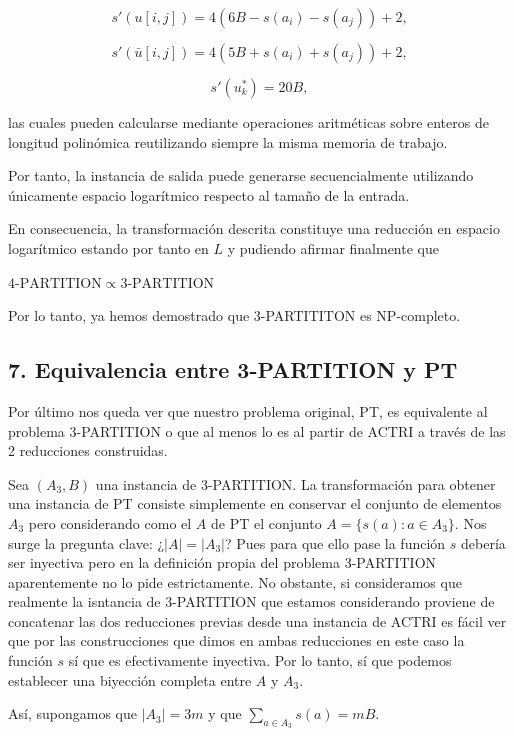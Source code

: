 \documentclass{article}
\begin{document}
\[
s'(u[i,j])=4(6B-s(a_i)-s(a_j))+2,
\]

\[
s'(\bar{u}[i,j])=4(5B+s(a_i)+s(a_j))+2,
\]

\[
s'(u_k^*)=20B,
\]

las cuales pueden calcularse mediante operaciones aritméticas sobre enteros de longitud polinómica reutilizando siempre la misma memoria de trabajo.

Por tanto, la instancia de salida puede generarse secuencialmente utilizando únicamente espacio logarítmico respecto al tamaño de la entrada.

\vspace{1\baselineskip}
En consecuencia, la transformación descrita constituye una reducción en espacio logarítmico estando por tanto en $L$ y pudiendo afirmar finalmente que 

\vspace{1\baselineskip}
$4\text{-PARTITION} \propto 3\text{-PARTITION}$

\vspace{1\baselineskip}
Por lo tanto, ya hemos demostrado que 3-PARTITITON es NP-completo.

\subsection*{7. Equivalencia entre 3-PARTITION y PT}

Por último nos queda ver que nuestro problema original, PT, es equivalente al problema 3-PARTITION o que al menos lo es al partir de ACTRI a través de las 2 reducciones construidas.


\vspace{1\baselineskip}
Sea $(A_3,B)$ una instancia de 3-PARTITION. La transformación para obtener una instancia de PT consiste simplemente en conservar el conjunto de elementos $A_3$ pero considerando como el $A$ de PT el conjunto $A = \{s(a) : a \in A_3\}$. Nos surge la pregunta clave: ¿$|A|=|A_3|$? Pues para que ello pase la función $s$ debería ser inyectiva pero en la definición propia del problema 3-PARTITION aparentemente no lo pide estrictamente. No obstante, si consideramos que realmente la isntancia de 3-PARTITION que estamos considerando proviene de concatenar las dos reducciones previas desde una instancia de ACTRI es fácil ver que por las construcciones que dimos en ambas reducciones en este caso la función $s$ sí que es efectivamente inyectiva. Por lo tanto, sí que podemos establecer una biyección completa entre $A$ y $A_3$. 


\vspace{1\baselineskip}
Así, supongamos que $|A_3|=3m$ y que $\sum_{a\in A_3} s(a) = mB$.
\end{document}
